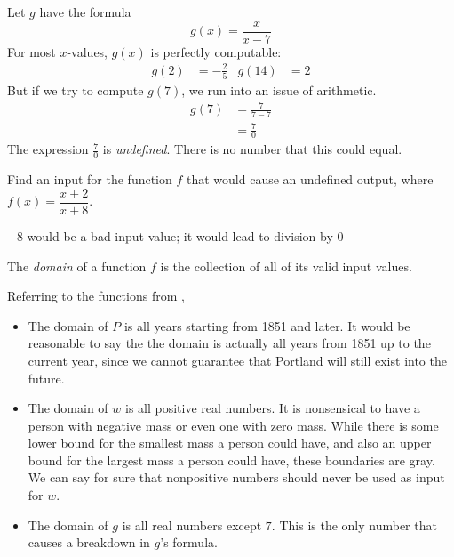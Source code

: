 \begin{pccexample}\label{fun:ex:contextfreedomain}
Let $g$ have the formula 
\[
g(x)=\frac{x}{x-7}
\] 
For most $x$-values, $g(x)$ is perfectly computable:
\begin{align*}
	g(2) & = -\frac{2}{5} & g(14) & = \num{2} 
\end{align*}
But if we try to compute $g(7)$, we run into an issue of arithmetic. 
\begin{align*}
	g(7) & = \frac{7}{7-7} \\
	     & = \frac{7}{0}   
\end{align*}
The expression $\frac{7}{0}$ is \emph{undefined}. There is no number that this could equal.
\end{pccexample}
\begin{doyouunderstand}
	\begin{problem}
	Find an input for the function $f$ that would cause an undefined output, where $f(x)=\dfrac{x+2}{x+8}$.
	\begin{shortsolution}
		\num{-8} would be a bad input value; it would lead to division by \num{0}
	\end{shortsolution}
	\end{problem}
\end{doyouunderstand}
\begin{pccdefinition}[Domain]
The \emph{domain} of a function $f$ is the collection of all of its valid input values.
\end{pccdefinition}
\begin{pccexample}
Referring to the functions from ,
\begin{itemize}
	\item The domain of $P$ is all years starting from 1851 and later. It would be reasonable to say the the domain is actually all years from 1851 up to the current year, since we cannot guarantee that Portland will still exist into the future.
	\item The domain of $w$ is all positive real numbers. It is nonsensical to have a person with negative mass or even one with zero mass. While there is some lower bound for the smallest mass a person could have, and also an upper bound for the largest mass a person could have, these boundaries are gray. We can say for sure that nonpositive numbers should never be used as input for $w$.
	\item The domain of $g$ is all real numbers except $7$. This is the only number that causes a breakdown in $g$'s formula. 
\end{itemize}
\end{pccexample}

